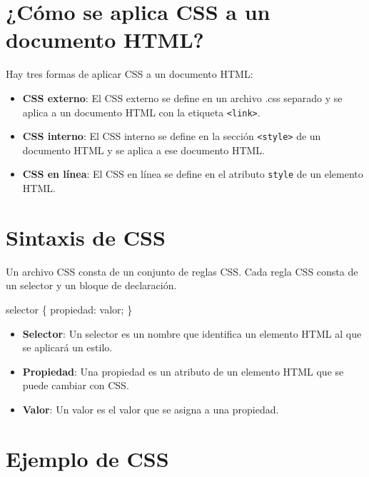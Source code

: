 \documentclass[
  a4paper,
  DIV=11,
  numbers=noendperiod,
  onepage,
  openany]{scrreprt}
\newenvironment{Shaded}{\begin{snugshade}}{\end{snugshade}}
\newcommand{\NormalTok}[1]{\textcolor[rgb]{0.00,0.23,0.31}{#1}}
\newcommand{\OperatorTok}[1]{\textcolor[rgb]{0.37,0.37,0.37}{#1}}
\begin{document}
\section{¿Cómo se aplica CSS a un documento
HTML?}\label{cuxf3mo-se-aplica-css-a-un-documento-html}

Hay tres formas de aplicar CSS a un documento HTML:

\begin{itemize}
\item
  \textbf{CSS externo}: El CSS externo se define en un archivo .css
  separado y se aplica a un documento HTML con la etiqueta
  \texttt{\textless{}link\textgreater{}}.
\item
  \textbf{CSS interno}: El CSS interno se define en la sección
  \texttt{\textless{}style\textgreater{}} de un documento HTML y se
  aplica a ese documento HTML.
\item
  \textbf{CSS en línea}: El CSS en línea se define en el atributo
  \texttt{style} de un elemento HTML.
\end{itemize}

\section{Sintaxis de CSS}\label{sintaxis-de-css}

Un archivo CSS consta de un conjunto de reglas CSS. Cada regla CSS
consta de un selector y un bloque de declaración.

\begin{Shaded}
\begin{Highlighting}[]
\NormalTok{selector \{}
\NormalTok{  propiedad: valor}\OperatorTok{;}
\NormalTok{\}}
\end{Highlighting}
\end{Shaded}

\begin{itemize}
\item
  \textbf{Selector}: Un selector es un nombre que identifica un elemento
  HTML al que se aplicará un estilo.
\item
  \textbf{Propiedad}: Una propiedad es un atributo de un elemento HTML
  que se puede cambiar con CSS.
\item
  \textbf{Valor}: Un valor es el valor que se asigna a una propiedad.
\end{itemize}

\section{Ejemplo de CSS}\label{ejemplo-de-css}
\end{document}
